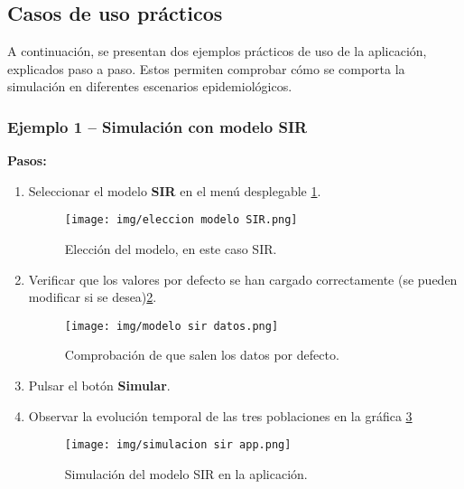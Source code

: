 \subsection{Casos de uso prácticos}

A continuación, se presentan dos ejemplos prácticos de uso de la aplicación, explicados paso a paso. Estos permiten comprobar cómo se comporta la simulación en diferentes escenarios epidemiológicos.

\vspace{1em}
\subsubsection{Ejemplo 1 – Simulación con modelo SIR}

\textbf{Pasos:}
\begin{enumerate}
    \item Seleccionar el modelo \textbf{SIR} en el menú desplegable \ref{fig:eleccion sir}.
    \begin{figure}[H]
        \centering
        \texttt{[image: img/eleccion modelo SIR.png]}
        \caption{Elección del modelo, en este caso SIR.}
        \label{fig:eleccion sir}
        
    \end{figure}
    
     \item Verificar que los valores por defecto se han cargado correctamente (se pueden modificar si se desea)\ref{fig:datos defecto}.

\begin{figure}[H]
        \centering
        \texttt{[image: img/modelo sir datos.png]}
        \caption{Comprobación de que salen los datos por defecto.}
        \label{fig:datos defecto}
       
    \end{figure}
     
      \item Pulsar el botón \textbf{Simular}.

     
    \item Observar la evolución temporal de las tres poblaciones en la gráfica \ref{fig:simulacion sir ap}
    
   

    
   
   
    \begin{figure}[H]
        \centering
        \texttt{[image: img/simulacion sir app.png]}
        \caption{Simulación del modelo SIR en la aplicación.}
        \label{fig:simulacion sir ap}
        
    \end{figure}
\end{enumerate}

